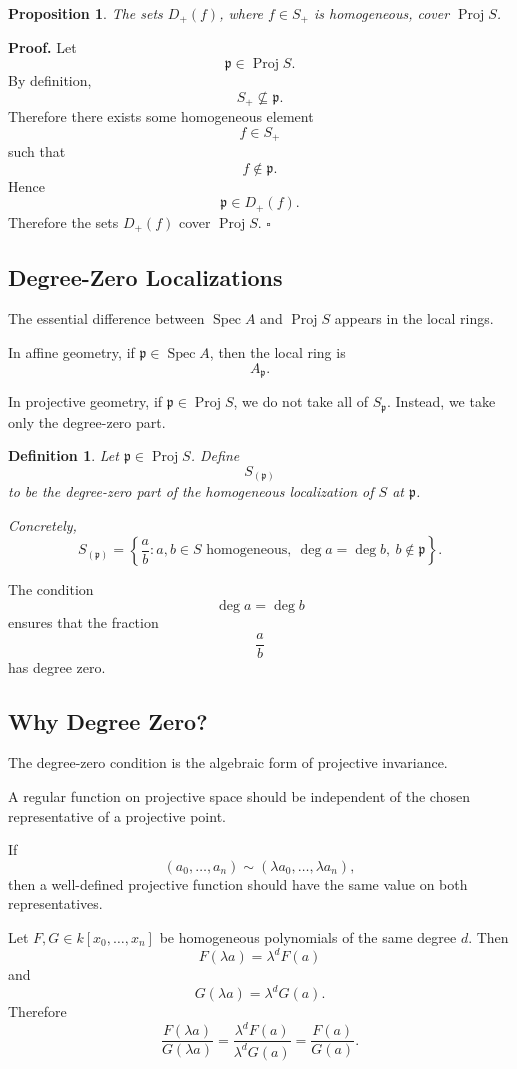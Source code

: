\documentclass[12pt,a4paper]{article}
\DeclareMathOperator{\Spec}{Spec}
\DeclareMathOperator{\Proj}{Proj}
\newtheorem{proposition}[theorem]{Proposition}
\theoremstyle{notespace}
\newtheorem{definition}{Definition}[subsection]
\begin{document}
\begin{proposition}
	The sets \(D_+(f)\), where \(f\in S_+\) is homogeneous, cover \(\Proj S\).
\end{proposition}

\textbf{Proof.}
Let
\[
\mathfrak p\in \Proj S.
\]
By definition,
\[
S_+\not\subseteq \mathfrak p.
\]
Therefore there exists some homogeneous element
\[
f\in S_+
\]
such that
\[
f\notin \mathfrak p.
\]
Hence
\[
\mathfrak p\in D_+(f).
\]
Therefore the sets \(D_+(f)\) cover \(\Proj S\).
\(\square\)

\subsection{Degree-Zero Localizations}

The essential difference between \(\Spec A\) and \(\Proj S\) appears in the local rings.

In affine geometry, if \(\mathfrak p\in\Spec A\), then the local ring is
\[
A_{\mathfrak p}.
\]

In projective geometry, if \(\mathfrak p\in\Proj S\), we do not take all of
\(S_{\mathfrak p}\). Instead, we take only the degree-zero part.

\begin{definition}
	Let \(\mathfrak p\in\Proj S\). Define
	\[
	S_{(\mathfrak p)}
	\]
	to be the degree-zero part of the homogeneous localization of \(S\) at \(\mathfrak p\).
	
	Concretely,
	\[
	S_{(\mathfrak p)}
	=
	\left\{
	\frac{a}{b}:
	a,b\in S \text{ homogeneous},\
	\deg a=\deg b,\
	b\notin \mathfrak p
	\right\}.
	\]
\end{definition}

The condition
\[
\deg a=\deg b
\]
ensures that the fraction
\[
\frac{a}{b}
\]
has degree zero.

\subsection{Why Degree Zero?}

The degree-zero condition is the algebraic form of projective invariance.

A regular function on projective space should be independent of the chosen representative
of a projective point.

If
\[
(a_0,\dots,a_n)\sim(\lambda a_0,\dots,\lambda a_n),
\]
then a well-defined projective function should have the same value on both representatives.

Let \(F,G\in k[x_0,\dots,x_n]\) be homogeneous polynomials of the same degree \(d\).
Then
\[
F(\lambda a)=\lambda^dF(a)
\]
and
\[
G(\lambda a)=\lambda^dG(a).
\]
Therefore
\[
\frac{F(\lambda a)}{G(\lambda a)}
=
\frac{\lambda^dF(a)}{\lambda^dG(a)}
=
\frac{F(a)}{G(a)}.
\]
\end{document}

